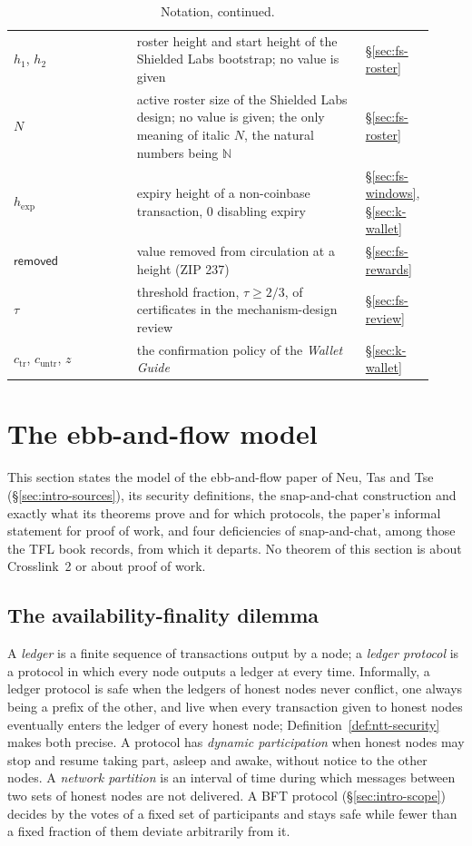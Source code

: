 \documentclass[11pt,a4paper]{article}
\theoremstyle{definition}
\newcommand{\N}{\mathbb{N}}
\newcommand{\ctr}{c_{\mathrm{tr}}}
\newcommand{\cuntr}{c_{\mathrm{untr}}}
\newcommand{\removed}{\mathsf{removed}}
\begin{document}
\begin{table}[tbp]
\begin{tabular}{@{}p{0.29\linewidth}p{0.52\linewidth}p{0.11\linewidth}@{}}
$h_1$, $h_2$
  & roster height and start height of the Shielded Labs bootstrap; no value
  is given
  & \S\ref{sec:fs-roster} \\
$N$
  & active roster size of the Shielded Labs design; no value is given; the
  only meaning of italic $N$, the natural numbers being $\N$
  & \S\ref{sec:fs-roster} \\
$h_{\mathrm{exp}}$
  & expiry height of a non-coinbase transaction, $0$ disabling expiry
  & \S\ref{sec:fs-windows}, \S\ref{sec:k-wallet} \\
$\removed$
  & value removed from circulation at a height (ZIP 237)
  & \S\ref{sec:fs-rewards} \\
$\tau$
  & threshold fraction, $\tau \ge 2/3$, of certificates in the
  mechanism-design review
  & \S\ref{sec:fs-review} \\
$\ctr$, $\cuntr$, $z$
  & the confirmation policy of the \emph{Wallet Guide}
  & \S\ref{sec:k-wallet} \\
\bottomrule
\end{tabular}
\caption[]{Notation, continued.}
\end{table}

\section{The ebb-and-flow model}\label{sec:model}

This section states the model of the ebb-and-flow paper of Neu, Tas and Tse
(\S\ref{sec:intro-sources}), its security definitions, the snap-and-chat
construction and exactly what its theorems prove and for which protocols,
the paper's informal statement for proof of work, and four deficiencies of
snap-and-chat, among those the TFL book records, from which it departs. No
theorem of this section is about Crosslink~2 or about proof of work.

\subsection{The availability-finality dilemma}\label{sec:model-dilemma}

A \emph{ledger} is a finite sequence of transactions output by a node; a
\emph{ledger protocol} is a protocol in which every node outputs a ledger at
every time. Informally, a ledger protocol is safe when the ledgers of honest
nodes never conflict, one always being a prefix of the other, and live when
every transaction given to honest nodes eventually enters the ledger of every
honest node; Definition~\ref{def:ntt-security} makes both precise. A protocol
has \emph{dynamic participation} when honest nodes may stop and resume taking
part, asleep and awake, without notice to the other nodes. A \emph{network
partition} is an interval of time during which messages between two sets of
honest nodes are not delivered. A BFT protocol (\S\ref{sec:intro-scope}) decides
by the votes of a fixed set of participants and stays safe while fewer than a
fixed fraction of them deviate arbitrarily from it.
\end{document}
